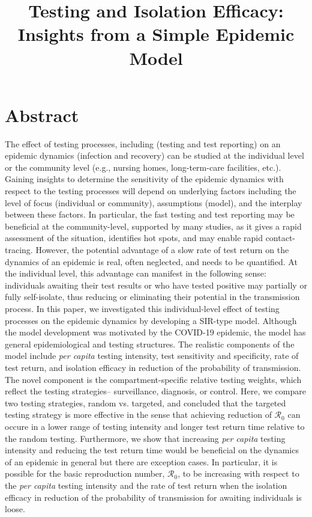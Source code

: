 \documentclass[12pt]{article}
\title{Testing and Isolation Efficacy: Insights from a Simple Epidemic Model}
\newcommand{\percap}{\emph{per capita}\xspace}
\newcommand{\Rnum}{\ensuremath{\mathcal{R}_0}}
\newcommand{\covid}{COVID-19\xspace}
\DeclareRobustCommand\_{\ifmmode\expandafter\subtxt\else\textunderscore\fi}
\theoremstyle{definition} %
\begin{document}
\maketitle

\linenumbers

\section{Abstract}

The effect of testing processes, including (testing and test reporting) on an epidemic dynamics (infection and recovery) can be studied at the individual level or the community level (e.g., nursing homes, long-term-care facilities, etc.). 
Gaining insights to determine the sensitivity of the epidemic dynamics with respect to the testing processes will depend on underlying factors including the level of focus (individual or community), assumptions (model), and the interplay between these factors. 
In particular, the fast testing and test reporting may be beneficial at the community-level, supported by many studies, as it gives a rapid assessment of the situation, identifies hot spots, and may enable rapid contact-tracing. However, the potential advantage of a slow rate of test return on the dynamics of an epidemic is real, often neglected, and needs to be quantified. At the individual level, this advantage can manifest in the following sense: individuals awaiting their test results or who have tested positive may partially or fully self-isolate, thus reducing or eliminating their potential in the transmission process.
In this paper, we investigated this individual-level effect of testing processes on the epidemic dynamics by developing a SIR-type model.
Although the model development was motivated by the \covid epidemic, the model has general epidemiological and testing structures. The realistic components of the model include \percap testing intensity, test sensitivity and specificity, rate of test return, and isolation efficacy in reduction of the probability of transmission. The novel component is the compartment-specific relative testing weights, which reflect the testing strategies-- surveillance, diagnosis, or control.
Here, we compare two testing strategies, random vs. targeted, and concluded that the targeted testing strategy is more effective in the sense that achieving reduction of $\Rnum$ can occure in a lower range of testing intensity and longer test return time relative to the random testing. Furthermore, we show that increasing \percap testing intensity and reducing the test return time would be beneficial on the dynamics of an epidemic in general but there are exception cases. In particular, it is possible for the basic reproduction number, $\Rnum$, to be increasing with respect to the \percap testing intensity and the rate of test return when the isolation efficacy in reduction of the probability of transmission for awaiting individuals is loose.  
\end{document}
